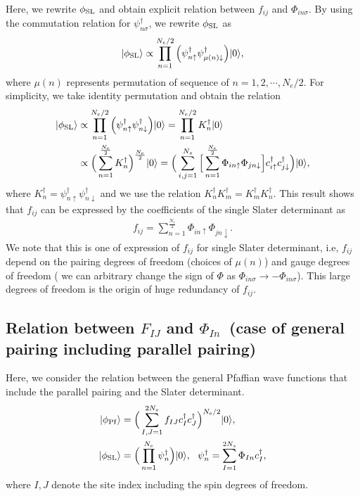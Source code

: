 Here, we rewrite $\phi_{\rm SL}$ and obtain explicit 
relation between $f_{ij}$ and $\Phi_{in\sigma}$.
By using the commutation relation for $\psi^{\dagger}_{n\sigma}$,
we rewrite $\phi_{\rm SL}$ as 
\begin{align}
|\phi_{\rm SL}\rangle \propto \prod_{n=1}^{N_{e}/2}\Big(\psi_{n\uparrow}^{\dagger}\psi_{\mu(n)\downarrow}^{\dagger}\Big)|0\rangle,
\end{align}
where $\mu(n)$ represents permutation of sequence of $n= 1, 2, \cdots, N_{e}/2$.
For simplicity, we take identity permutation and obtain the relation 
\begin{align}
|\phi_{\rm SL}\rangle &\propto \prod_{n=1}^{N_{e}/2}\Big(\psi_{n\uparrow}^{\dagger}\psi_{n\downarrow}^{\dagger}\Big)|0\rangle
=\prod_{n=1}^{N_{e}/2} K_{n}^{\dagger}|0\rangle \\
&\propto\Big(\sum_{n=1}^{\frac{N_{e}}{2}}K_{n}^{\dagger}\Big)^{\frac{N_{e}}{2}} |0\rangle
=\Big(\sum_{i,j=1}^{N_{s}}\Big[\sum_{n=1}^{\frac{N_{e}}{2}}\Phi_{in\uparrow}\Phi_{jn\downarrow}\Big]
c_{i\uparrow}^{\dagger}c_{j\downarrow}^{\dagger}\Big)|0\rangle,
\end{align}
where $K_{n}^{\dagger}=\psi_{n\uparrow}^{\dagger}\psi_{n\downarrow}^{\dagger}$ and
we use the relation  $K_{n}^{\dagger}K_{m}^{\dagger}=K_{m}^{\dagger}K_{n}^{\dagger}$.
This result shows that $f_{ij}$ can be expressed by the 
coefficients of the single Slater determinant as
\begin{align}
f_{ij}=\sum_{n=1}^{\frac{N_{e}}{2}}\Phi_{in\uparrow}\Phi_{jn\downarrow}.
\end{align}
We note that this is one of expression of $f_{ij}$ for 
single Slater determinant, i.e, $f_{ij}$ depend on
the pairing degrees of freedom (choices  of $\mu(n)$) and
gauge degrees of freedom ( we can arbitrary change
the sign of $\Phi$ as $\Phi_{in\sigma}\rightarrow -\Phi_{in\sigma}$).
This large degrees of freedom is the origin of huge redundancy of
$f_{ij}$.

\subsection{Relation between $F_{IJ}$ and $\Phi_{In}$~(case of general pairing including parallel pairing)}
Here, we consider the relation between the general Pfaffian 
wave functions that include the parallel pairing and
the Slater determinant.
\begin{align}
|\phi_{\rm Pf}\rangle&=\Big(\sum_{I,J=1}^{2N_{s}}f_{IJ}c_{I}^{\dagger}c_{J}^{\dagger}\Big)^{N_{\rm e}/2}|0\rangle, \\
|\phi_{\rm SL}\rangle&=\Big(\prod_{n=1}^{N_{e}}\psi_{n}^{\dagger}\Big)|0\rangle,~~\psi_{n}^{\dagger}=\sum_{I=1}^{2N_{s}}\Phi_{In}c^{\dagger}_{I},
\end{align}
where $I,J$ denote the site index including the spin degrees of freedom.

